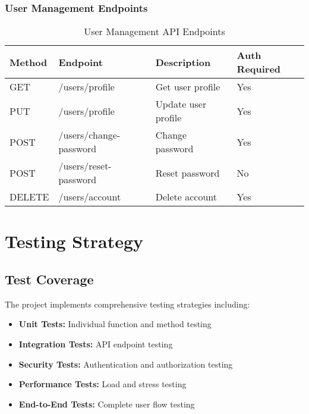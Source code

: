 \documentclass[12pt,a4paper]{article}
\begin{document}
\subsubsection{User Management Endpoints}

\begin{table}[H]
    \centering
    \begin{tabular}{|l|l|l|l|}
        \hline
        \textbf{Method} & \textbf{Endpoint} & \textbf{Description} & \textbf{Auth Required} \\
        \hline
        GET & /users/profile & Get user profile & Yes \\
        \hline
        PUT & /users/profile & Update user profile & Yes \\
        \hline
        POST & /users/change-password & Change password & Yes \\
        \hline
        POST & /users/reset-password & Reset password & No \\
        \hline
        DELETE & /users/account & Delete account & Yes \\
        \hline
    \end{tabular}
    \caption{User Management API Endpoints}
    \label{tab:user-endpoints}
\end{table}

\section{Testing Strategy}

\subsection{Test Coverage}

The project implements comprehensive testing strategies including:

\begin{itemize}
    \item \textbf{Unit Tests:} Individual function and method testing
    \item \textbf{Integration Tests:} API endpoint testing
    \item \textbf{Security Tests:} Authentication and authorization testing
    \item \textbf{Performance Tests:} Load and stress testing
    \item \textbf{End-to-End Tests:} Complete user flow testing
\end{itemize}
\end{document}
